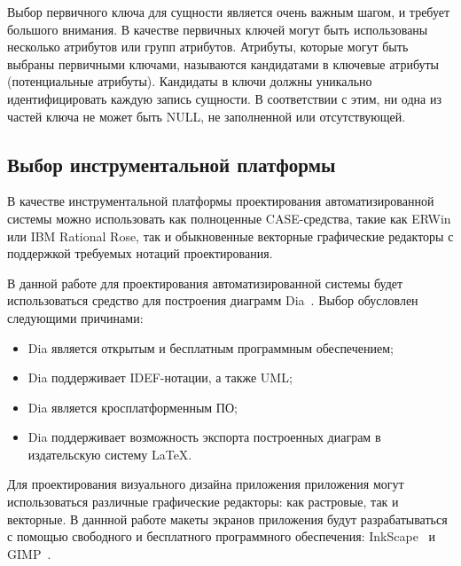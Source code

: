 Выбор первичного ключа для сущности является очень важным шагом,
и требует большого внимания. В качестве первичных ключей могут быть
использованы несколько атрибутов или групп атрибутов. Атрибуты, которые
могут быть выбраны первичными ключами, называются кандидатами в
ключевые атрибуты (потенциальные атрибуты). Кандидаты в ключи должны
уникально идентифицировать каждую запись сущности. В соответствии с
этим, ни одна из частей ключа не может быть NULL, не заполненной или
отсутствующей.

\pagebreak
\subsection{Выбор инструментальной платформы}

В качестве инструментальной платформы проектирования автоматизированной
системы можно использовать как полноценные CASE-средства, такие как ERWin или
IBM Rational Rose, так и обыкновенные векторные графические редакторы с поддержкой
требуемых нотаций проектирования.

В данной работе для проектирования автоматизированной системы будет
использоваться средство для построения диаграмм Dia~\cite{website_dia}. Выбор обусловлен
следующими причинами:
\begin{itemize}
  \item Dia является открытым и бесплатным программным обеспечением;
  \item Dia поддерживает IDEF-нотации, а также UML;
  \item Dia является кросплатформенным ПО;
  \item Dia поддерживает возможность экспорта построенных диаграм в
    издательскую систему LaTeX.
\end{itemize}

Для проектирования визуального дизайна приложения приложения могут использоваться
различные графические редакторы: как растровые, так и векторные.
В даннной работе макеты экранов приложения будут разрабатываться с помощью
свободного и бесплатного программного обеспечения:
InkScape~\cite{website_inkscape} и GIMP~\cite{website_gimp}.